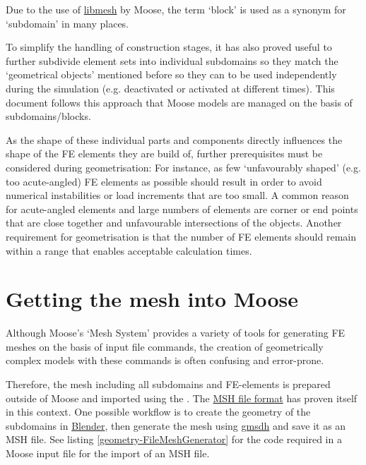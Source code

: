 Due to the use of \href{https://libmesh.github.io/}{libmesh} by Moose, the term
‘block’ is used as a synonym for ‘subdomain’ in many places.

To simplify the handling of construction stages, it has also proved useful to
further subdivide element sets into individual subdomains so they match the
‘geometrical objects’ mentioned before so they can to be used independently
during the simulation (e.g. deactivated or activated at different times). This
document follows this approach that Moose models are managed on the basis of
subdomains/blocks.

As the shape of these individual parts and components directly influences the
shape of the FE elements they are build of, further prerequisites must be
considered during geometrisation: For instance, as few ‘unfavourably shaped’
(e.g. too acute-angled) FE elements as possible should result in order to avoid
numerical instabilities or load increments that are too small. A common reason
for acute-angled elements and large numbers of elements are corner or end
points that are close together and unfavourable intersections of the objects.
Another requirement for geometrisation is that the number of FE elements should
remain within a range that enables acceptable calculation times.

\section{Getting the mesh into Moose}
\label{geometry-getting-the-mesh-into-moose}

Although Moose's ‘Mesh System’ provides a variety of tools for generating FE
meshes on the basis of input file commands, the creation of geometrically
complex models with these commands is often confusing and error-prone.

Therefore, the mesh including all subdomains and FE-elements is prepared
outside of Moose and imported using the . The
\href{https://gmsh.info/doc/texinfo/gmsh.html#MSH-file-format}{MSH file format}
has proven itself in this context. One possible workflow is to create the
geometry of the subdomains in \href{https://blender.org}{Blender}, then
generate the mesh using \href{https://gmsh.info/}{gmsdh} and save it as an MSH
file. See listing \autoref{geometry-FileMeshGenerator} for the code required in
a Moose input file for the import of an MSH file.

